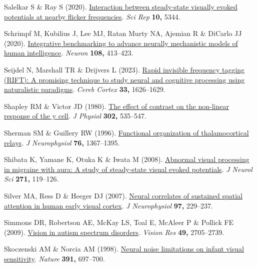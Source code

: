 \documentclass[
  letterpaper,
  DIV=11,
  numbers=noendperiod]{scrartcl}
\newlength{\cslhangindent}
\newenvironment{CSLReferences}[2] %
 {\begin{list}{}{%
  \setlength{\itemindent}{0pt}
  \setlength{\leftmargin}{0pt}
  \setlength{\parsep}{0pt}
  \ifodd #1
   \setlength{\leftmargin}{\cslhangindent}
   \setlength{\itemindent}{-1\cslhangindent}
  \fi
  \setlength{\itemsep}{#2\baselineskip}}}
 {\end{list}}
\begin{document}
\begin{CSLReferences}{1}{1}
Salelkar S \& Ray S (2020).
\href{https://doi.org/10.1038/s41598-020-62180-y}{Interaction between
steady-state visually evoked potentials at nearby flicker frequencies}.
\emph{Sci Rep} \textbf{10,} 5344.

Schrimpf M, Kubilius J, Lee MJ, Ratan Murty NA, Ajemian R \& DiCarlo JJ
(2020). \href{https://doi.org/10.1016/j.neuron.2020.07.040}{Integrative
benchmarking to advance neurally mechanistic models of human
intelligence}. \emph{Neuron} \textbf{108,} 413--423.

Seijdel N, Marshall TR \& Drijvers L (2023).
\href{https://doi.org/10.1093/cercor/bhac160}{Rapid invisible frequency
tagging (RIFT): A promising technique to study neural and cognitive
processing using naturalistic paradigms}. \emph{Cereb Cortex}
\textbf{33,} 1626--1629.

Shapley RM \& Victor JD (1980).
\href{https://doi.org/10.1113/jphysiol.1980.sp013259}{The effect of
contrast on the non-linear response of the y cell}. \emph{J Physiol}
\textbf{302,} 535--547.

Sherman SM \& Guillery RW (1996).
\href{https://doi.org/10.1152/jn.1996.76.3.1367}{Functional organization
of thalamocortical relays}. \emph{J Neurophysiol} \textbf{76,}
1367--1395.

Shibata K, Yamane K, Otuka K \& Iwata M (2008).
\href{https://doi.org/10.1016/j.jns.2008.04.004}{Abnormal visual
processing in migraine with aura: A study of steady-state visual evoked
potentials}. \emph{J Neurol Sci} \textbf{271,} 119--126.

Silver MA, Ress D \& Heeger DJ (2007).
\href{https://doi.org/10.1152/jn.00677.2006}{Neural correlates of
sustained spatial attention in human early visual cortex}. \emph{J
Neurophysiol} \textbf{97,} 229--237.

Simmons DR, Robertson AE, McKay LS, Toal E, McAleer P \& Pollick FE
(2009). \href{https://doi.org/10.1016/j.visres.2009.08.005}{Vision in
autism spectrum disorders}. \emph{Vision Res} \textbf{49,} 2705--2739.

Skoczenski AM \& Norcia AM (1998).
\href{https://doi.org/10.1038/35630}{Neural noise limitations on infant
visual sensitivity}. \emph{Nature} \textbf{391,} 697--700.


\end{CSLReferences}
\end{document}
